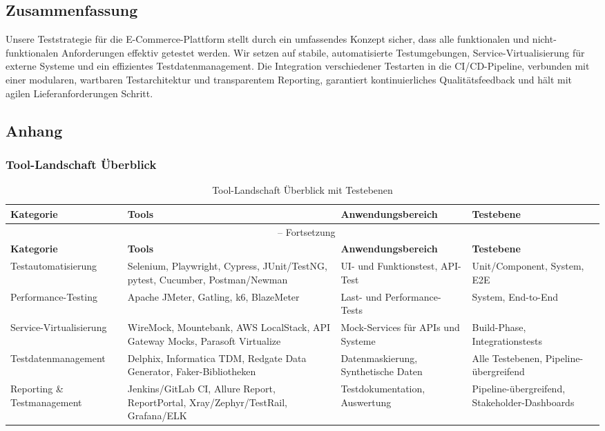 \subsection{Zusammenfassung}
Unsere Teststrategie für die E-Commerce-Plattform stellt durch ein umfassendes Konzept sicher,
dass alle funktionalen und nicht-funktionalen Anforderungen effektiv getestet werden.
Wir setzen auf stabile, automatisierte Testumgebungen, Service-Virtualisierung für externe Systeme
und ein effizientes Testdatenmanagement. Die Integration verschiedener Testarten in die
CI/CD-Pipeline, verbunden mit einer modularen, wartbaren Testarchitektur und transparentem
Reporting, garantiert kontinuierliches Qualitätsfeedback und hält mit agilen Lieferanforderungen
Schritt.

\newpage
\subsection{Anhang}
\subsubsection{Tool-Landschaft Überblick}
\begin{longtable}{|p{3.5cm}|p{3.5cm}|p{4cm}|p{3cm}|}
\caption{Tool-Landschaft Überblick mit Testebenen} \\ \hline
\textbf{Kategorie} & \textbf{Tools} & \textbf{Anwendungsbereich} & \textbf{Testebene} \\ \hline
\endfirsthead

\multicolumn{4}{c}{\tablename\ \thetable{} -- Fortsetzung} \\ \hline
\textbf{Kategorie} & \textbf{Tools} & \textbf{Anwendungsbereich} & \textbf{Testebene} \\ \hline
\endhead

Testautomatisierung &
Selenium, Playwright, Cypress, JUnit/TestNG, pytest, Cucumber, Postman/Newman &
UI- und Funktionstest, API-Test &
Unit/Component, System, E2E \\ \hline

Performance-Testing &
Apache JMeter, Gatling, k6, BlazeMeter &
Last- und Performance-Tests &
System, End-to-End \\ \hline

Service-Virtualisierung &
WireMock, Mountebank, AWS LocalStack, API Gateway Mocks, Parasoft Virtualize &
Mock-Services für APIs und Systeme &
Build-Phase, Integrationstests \\ \hline

Testdatenmanagement &
Delphix, Informatica TDM, Redgate Data Generator, Faker-Bibliotheken &
Datenmaskierung, Synthetische Daten &
Alle Testebenen, Pipeline-übergreifend \\ \hline

Reporting \& Testmanagement &
Jenkins/GitLab CI, Allure Report, ReportPortal, Xray/Zephyr/TestRail, Grafana/ELK &
Testdokumentation, Auswertung &
Pipeline-übergreifend, Stakeholder-Dashboards \\ \hline

\end{longtable}

